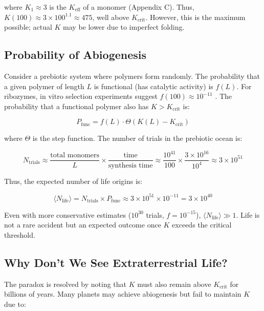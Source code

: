 \documentclass[12pt,a4paper]{article}
\theoremstyle{remark}
\newcommand{\Keff}{K_{\mathrm{eff}}}
\newcommand{\Keffcrit}{K_{\mathrm{crit}}}
\newcommand{\Ntrials}{N_{\mathrm{trials}}}
\newcommand{\Nlife}{\langle N_{\mathrm{life}}\rangle}
\begin{document}
	where $K_1 \approx 3$ is the $\Keff$ of a monomer (Appendix C). Thus, $K(100) \approx 3 \times 100^{1.1} \approx 475$, well above $K_{\text{crit}}$. However, this is the maximum possible; actual $K$ may be lower due to imperfect folding.
	
	\subsection{Probability of Abiogenesis}
	
	Consider a prebiotic system where polymers form randomly. The probability that a given polymer of length $L$ is functional (has catalytic activity) is $f(L)$. For ribozymes, in vitro selection experiments suggest $f(100) \approx 10^{-11}$ \cite{Joyce2002}. The probability that a functional polymer also has $K > K_{\text{crit}}$ is:
	
	\begin{equation}
		P_{\text{func}} = f(L) \cdot \Theta(K(L) - K_{\text{crit}})
		\label{eq:Pfunc}
	\end{equation}
	
	where $\Theta$ is the step function. The number of trials in the prebiotic ocean is:
	
	\begin{equation}
		\Ntrials \approx \frac{\text{total monomers}}{L} \times \frac{\text{time}}{\text{synthesis time}} \approx \frac{10^{41}}{100} \times \frac{3\times 10^{16}}{10^4} \approx 3 \times 10^{51}
		\label{eq:trials}
	\end{equation}
	
	Thus, the expected number of life origins is:
	
	\begin{equation}
		\Nlife = \Ntrials \times P_{\text{func}} \approx 3 \times 10^{51} \times 10^{-11} = 3 \times 10^{40}
		\label{eq:Nlife}
	\end{equation}
	
	Even with more conservative estimates ($10^{30}$ trials, $f=10^{-15}$), $\Nlife \gg 1$. Life is not a rare accident but an expected outcome once $K$ exceeds the critical threshold.
	
	\subsection{Why Don't We See Extraterrestrial Life?}
	
	The paradox is resolved by noting that $K$ must also remain above $\Keffcrit$ for billions of years. Many planets may achieve abiogenesis but fail to maintain $K$ due to:
	
\end{document}
